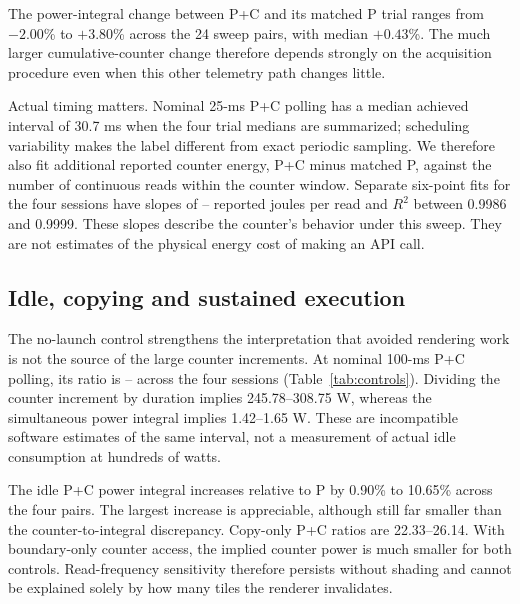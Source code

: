 \documentclass[10pt,conference]{IEEEtran}
\begin{document}
The power-integral change between P+C and its matched P trial ranges from $-2.00$\% to $+3.80$\% across the 24 sweep pairs, with median $+0.43$\%. The much larger cumulative-counter change therefore depends strongly on the acquisition procedure even when this other telemetry path changes little.

Actual timing matters. Nominal 25-ms P+C polling has a median achieved interval of 30.7 ms when the four trial medians are summarized; scheduling variability makes the label different from exact periodic sampling. We therefore also fit additional reported counter energy, P+C minus matched P, against the number of continuous reads within the counter window. Separate six-point fits for the four sessions have slopes of \CounterSlopeMin{}--\CounterSlopeMax{} reported joules per read and $R^2$ between 0.9986 and 0.9999. These slopes describe the counter's behavior under this sweep. They are not estimates of the physical energy cost of making an API call.

\begin{table}[t]
\centering
\caption{Polling sweep: medians across four sessions. Achieved interval summarizes each P+C trial's median query spacing. P and P+C columns give $R=\widehat E^C/\widehat E^P$. The figure shows individual ratios.}
\label{tab:polling}

\end{table}

\subsection{Idle, copying and sustained execution}
The no-launch control strengthens the interpretation that avoided rendering work is not the source of the large counter increments. At nominal 100-ms P+C polling, its ratio is \IdleRatioMin{}--\IdleRatioMax{} across the four sessions (Table~\ref{tab:controls}). Dividing the counter increment by duration implies 245.78--308.75 W, whereas the simultaneous power integral implies 1.42--1.65 W. These are incompatible software estimates of the same interval, not a measurement of actual idle consumption at hundreds of watts.

The idle P+C power integral increases relative to P by 0.90\% to 10.65\% across the four pairs. The largest increase is appreciable, although still far smaller than the counter-to-integral discrepancy. Copy-only P+C ratios are 22.33--26.14. With boundary-only counter access, the implied counter power is much smaller for both controls. Read-frequency sensitivity therefore persists without shading and cannot be explained solely by how many tiles the renderer invalidates.
\end{document}
